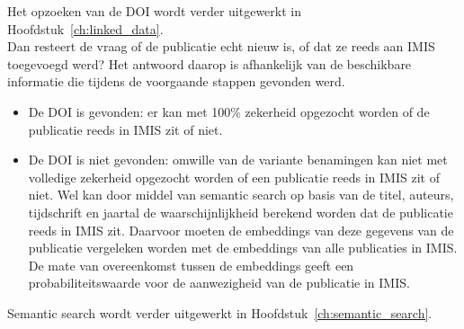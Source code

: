 Het opzoeken van de DOI wordt verder uitgewerkt in Hoofdstuk~\ref{ch:linked_data}.\\
Dan resteert de vraag of de publicatie echt nieuw is, of dat ze reeds aan IMIS toegevoegd werd? Het antwoord daarop is afhankelijk van de beschikbare informatie die tijdens de voorgaande stappen gevonden werd.
\begin{itemize}
    \item De DOI is gevonden: er kan met 100\% zekerheid opgezocht worden of de publicatie reeds in IMIS zit of niet.
    \item De DOI is niet gevonden: omwille van de variante benamingen kan niet met volledige zekerheid opgezocht worden of een publicatie reeds in IMIS zit of niet. Wel kan door middel van semantic search op basis van de titel, auteurs, tijdschrift en jaartal de waarschijnlijkheid berekend worden dat de publicatie reeds in IMIS zit. Daarvoor moeten de embeddings van deze gegevens van de publicatie vergeleken worden met de embeddings van alle publicaties in IMIS. De mate van overeenkomst tussen de embeddings geeft een probabiliteitswaarde voor de aanwezigheid van de publicatie in IMIS.
\end{itemize}
Semantic search wordt verder uitgewerkt in Hoofdstuk~\ref{ch:semantic_search}.




